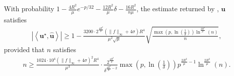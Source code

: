 \documentclass[final,12pt]{colt2018} %
\renewcommand\v[1]{{\ensuremath{\boldsymbol{#1}}}}
\newcommand\ip[1]{\left\langle #1 \right\rangle}
\begin{document}
\begin{theorem}
\label{theorem: learn_sim_algo_restated}
With probability $1- \frac{4R^2}{\mu} e^{-p/32} - \frac{12R^2}{\mu}\delta - \frac{16R^2}{n\mu}$, the estimate returned by , $\hat{\v u}$ satisfies
\begin{align*}
    |\ip{\v u^\star, \hat{\v u}} | \geq 1 - \frac{3200 \cdot 2^{\frac{4R^2}{\mu}}(\|f\|_\infty + 4 \sigma)R^4}{\mu^2\sqrt{\mu}} \sqrt{\frac{\max\left(p,\ln \left(\frac{1}{\delta}\right)\right)\ln^{\frac{2R^2}{\mu}}(n)}{n}} ,
\end{align*}
provided that $n$ satisfies
\begin{align*}
 n \geq \frac{1024 \cdot 10^4 (\|f\|_\infty + 4\sigma)^2 R^4}{\mu^3} \cdot \frac{2^{\frac{4R^2}{\mu}}}{\delta^{\frac{4R^2}{\mu}-2}} \max\left(p, \ln \left( \frac{1}{\delta} \right) \right) p^{\frac{2R^2}{\mu}-1} \ln^{\frac{2R^2}{\mu}}(n).
\end{align*}
\end{theorem}
\end{document}
